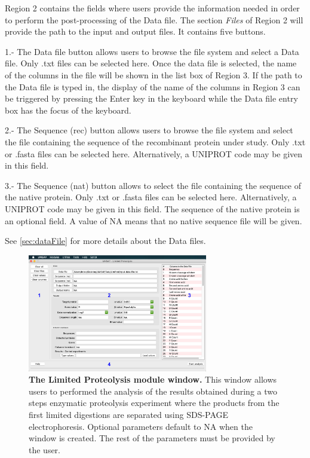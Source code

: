 Region \num{2} contains the fields where users provide the information needed in order to perform the post-processing of the Data file. The section \textit{Files} of Region \num{2} will provide the path to the input and output files. It contains five buttons. 

\num{1}.- The Data file button allows users to browse the file system and select a Data file. Only .txt files can be selected here. Once the data file is selected, the name of the columns in the file will be shown in the list box of Region \num{3}. If the path to the Data file is typed in, the display of the name of the columns in Region \num{3} can be triggered by pressing the Enter key in the keyboard while the Data file entry box has the focus of the keyboard.

\num{2}.- The Sequence (rec) button allows users to browse the file system and select the file containing the sequence of the recombinant protein under study. Only .txt or .fasta files can be selected here. Alternatively, a UNIPROT code may be given in this field.

\num{3}.- The Sequence (nat) button allows to select the file containing the sequence of the native protein. Only .txt or .fasta files can be selected here. Alternatively, a UNIPROT code may be given in this field. The sequence of the native protein is an optional field. A value of NA means that no native sequence file will be given. 

See \autoref{sec:dataFile} for more details about the Data files.

\begin{figure}[h]
	\centering
	\includegraphics[width=0.7\textwidth]{./IMAGES/MOD-LIMPROT/limprot-mod.jpg}
	\caption[The Limited Proteolysis module window]{\textbf{The Limited Proteolysis module window.} This window allows users to performed the analysis of the results obtained during a two steps enzymatic proteolysis experiment where the products from the first limited digestions are separated using SDS-PAGE electrophoresis. Optional parameters default to NA when the window is created. The rest of the parameters must be provided by the user.} 
	\label{fig:limprotMainWindow}
	\vspace{-5pt} 	
\end{figure} 

